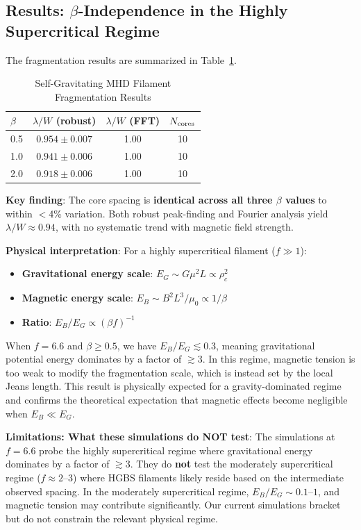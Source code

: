 \documentclass[11pt,a4paper]{article}
\begin{document}
\subsection{Results: $\beta$-Independence in the Highly Supercritical Regime}

The fragmentation results are summarized in Table~\ref{tab:mhd_sg}.

\begin{table}[H]
\centering
\caption{Self-Gravitating MHD Filament Fragmentation Results}
\label{tab:mhd_sg}
\begin{tabular}{lccc}
\toprule
$\beta$ & $\lambda/W$ (robust) & $\lambda/W$ (FFT) & $N_{\rm cores}$ \\
\midrule
0.5 & $0.954 \pm 0.007$ & 1.00 & 10 \\
1.0 & $0.941 \pm 0.006$ & 1.00 & 10 \\
2.0 & $0.918 \pm 0.006$ & 1.00 & 10 \\
\bottomrule
\end{tabular}
\end{table}

\textbf{Key finding}: The core spacing is \textbf{identical across all three $\beta$ values} to within $<$4\% variation. Both robust peak-finding and Fourier analysis yield $\lambda/W \approx 0.94$, with no systematic trend with magnetic field strength.

\textbf{Physical interpretation}: For a highly supercritical filament ($f \gg 1$):
\begin{itemize}
    \item \textbf{Gravitational energy scale}: $E_G \sim G \mu^2 L \propto \rho_c^2$
    \item \textbf{Magnetic energy scale}: $E_B \sim B^2 L^3 / \mu_0 \propto 1/\beta$
    \item \textbf{Ratio}: $E_B / E_G \propto (\beta f)^{-1}$
\end{itemize}
When $f = 6.6$ and $\beta \geq 0.5$, we have $E_B / E_G \lesssim 0.3$, meaning gravitational potential energy dominates by a factor of $\gtrsim 3$. In this regime, magnetic tension is too weak to modify the fragmentation scale, which is instead set by the local Jeans length. This result is physically expected for a gravity-dominated regime and confirms the theoretical expectation that magnetic effects become negligible when $E_B \ll E_G$.

\textbf{Limitations: What these simulations do NOT test}: The simulations at $f = 6.6$ probe the highly supercritical regime where gravitational energy dominates by a factor of $\gtrsim 3$. They do \textbf{not} test the moderately supercritical regime ($f \approx 2$--$3$) where HGBS filaments likely reside based on the intermediate observed spacing. In the moderately supercritical regime, $E_B / E_G \sim 0.1$--$1$, and magnetic tension may contribute significantly. Our current simulations bracket but do not constrain the relevant physical regime.
\end{document}
